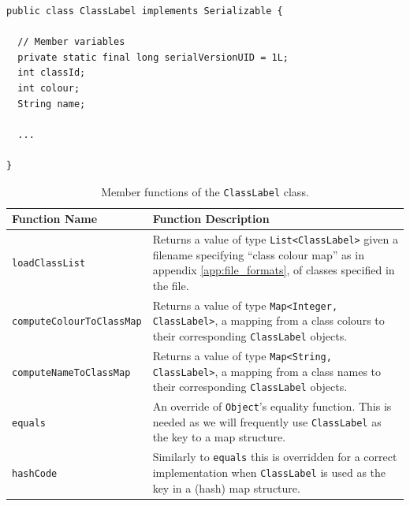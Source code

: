 \documentclass[12pt,twoside,notitlepage]{report}
\begin{document}
                \begin{lstlisting}[caption={The \texttt{ClassLabel} declaration, used to encapsulate a classification label and it's 
                        associated meta-data.}, label={lst:ClassLabel}]
public class ClassLabel implements Serializable {

  // Member variables
  private static final long serialVersionUID = 1L;
  int classId;
  int colour;
  String name;

  ...

}
                \end{lstlisting}

                \begin{table}[H]
                    \begin{tabularx}{\textwidth}{l|X}
                        \textbf{Function Name} & \textbf{Function Description} \\
                        \hline

                        \texttt{loadClassList} & 
                            Returns a value of type \texttt{List<ClassLabel>} given a filename specifying ``class colour 
                            map'' as in appendix \ref{app:file_formats}, of classes specified in the file. \\
                        \hline

                        \texttt{computeColourToClassMap} & 
                            Returns a value of type \texttt{Map<Integer, ClassLabel>}, a mapping from a class colours to 
                            their corresponding \texttt{ClassLabel} objects. \\ 
                        \hline

                        \texttt{computeNameToClassMap} & 
                            Returns a value of type \texttt{Map<String, ClassLabel>}, a mapping from a class names to 
                            their corresponding \texttt{ClassLabel} objects. \\
                        \hline

                        \texttt{equals} &
                            An override of \texttt{Object}'s equality function. This is needed as we will frequently 
                            use \texttt{ClassLabel} as the key to a map structure. \\
                        \hline

                        \texttt{hashCode} &
                            Similarly to \texttt{equals} this is overridden for a correct implementation when 
                            \texttt{ClassLabel} is used as the key in a (hash) map structure.

                    \end{tabularx}
                    \caption{Member functions of the \texttt{ClassLabel} class.}
                    \label{tab:ClassLabel}
                \end{table}
\end{document}

